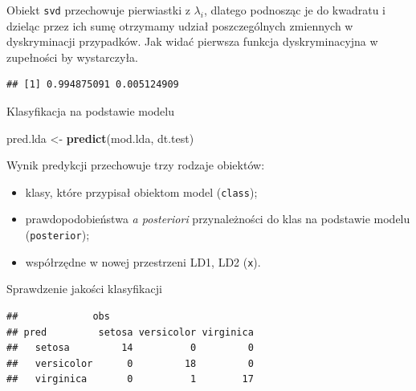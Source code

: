 \documentclass[]{book}
\newenvironment{Shaded}{\begin{snugshade}}{\end{snugshade}}
\newcommand{\DataTypeTok}[1]{\textcolor[rgb]{0.13,0.29,0.53}{#1}}
\newcommand{\DecValTok}[1]{\textcolor[rgb]{0.00,0.00,0.81}{#1}}
\newcommand{\KeywordTok}[1]{\textcolor[rgb]{0.13,0.29,0.53}{\textbf{#1}}}
\newcommand{\NormalTok}[1]{#1}
\newcommand{\OperatorTok}[1]{\textcolor[rgb]{0.81,0.36,0.00}{\textbf{#1}}}
\newcommand{\StringTok}[1]{\textcolor[rgb]{0.31,0.60,0.02}{#1}}
\providecommand{\tightlist}{%
  \setlength{\itemsep}{0pt}\setlength{\parskip}{0pt}}
\theoremstyle{plain}
\theoremstyle{definition}
\theoremstyle{definition}
\theoremstyle{definition}
\theoremstyle{definition}
\theoremstyle{remark}
\begin{document}
Obiekt \texttt{svd} przechowuje pierwiastki z \(\lambda_i\), dlatego podnosząc je do kwadratu i dzieląc przez ich sumę otrzymamy udział poszczególnych zmiennych w dyskryminacji przypadków. Jak widać pierwsza funkcja dyskryminacyjna w zupełności by wystarczyła.

\begin{Shaded}
\end{Shaded}

\begin{verbatim}
## [1] 0.994875091 0.005124909
\end{verbatim}

Klasyfikacja na podstawie modelu

\begin{Shaded}
\begin{Highlighting}[]
\NormalTok{pred.lda <-}\StringTok{ }\KeywordTok{predict}\NormalTok{(mod.lda, dt.test)}
\end{Highlighting}
\end{Shaded}

Wynik predykcji przechowuje trzy rodzaje obiektów:

\begin{itemize}
\tightlist
\item
  klasy, które przypisał obiektom model (\texttt{class});
\item
  prawdopodobieństwa \emph{a posteriori} przynależności do klas na podstawie modelu (\texttt{posterior});
\item
  współrzędne w nowej przestrzeni LD1, LD2 (\texttt{x}).
\end{itemize}

Sprawdzenie jakości klasyfikacji

\begin{Shaded}
\end{Shaded}

\begin{verbatim}
##             obs
## pred         setosa versicolor virginica
##   setosa         14          0         0
##   versicolor      0         18         0
##   virginica       0          1        17
\end{verbatim}
\end{document}

